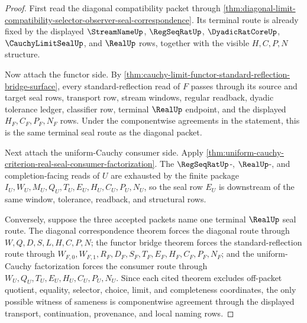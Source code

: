 \begin{proof}
First read the diagonal compatibility packet through \autoref{thm:diagonal-limit-compatibility-selector-observer-seal-correspondence}. Its terminal route is already fixed by the displayed $\StreamNameUp$, $\RegSeqRatUp$, $\DyadicRatCoreUp$, $\CauchyLimitSealUp$, and $\RealUp$ rows, together with the visible $H,C,P,N$ structure.

Now attach the functor side. By \autoref{thm:cauchy-limit-functor-standard-reflection-bridge-surface}, every standard-reflection read of $F$ passes through its source and target seal rows, transport row, stream windows, regular readback, dyadic tolerance ledger, classifier row, terminal $\RealUp$ endpoint, and the displayed $H_F,C_F,P_F,N_F$ rows. Under the componentwise agreements in the statement, this is the same terminal seal route as the diagonal packet.

Next attach the uniform-Cauchy consumer side. Apply \autoref{thm:uniform-cauchy-criterion-real-seal-consumer-factorization}. The $\RegSeqRatUp$-, $\RealUp$-, and completion-facing reads of $U$ are exhausted by the finite package $I_U,W_U,M_U,Q_U,T_U,E_U,H_U,C_U,P_U,N_U$, so the seal row $E_U$ is downstream of the same window, tolerance, readback, and structural rows.

Conversely, suppose the three accepted packets name one terminal $\RealUp$ seal route. The diagonal correspondence theorem forces the diagonal route through $W,Q,D,S,L,H,C,P,N$; the functor bridge theorem forces the standard-reflection route through $W_{F,0},W_{F,1},R_F,D_F,S_F,T_F,E_F,H_F,C_F,P_F,N_F$; and the uniform-Cauchy factorization forces the consumer route through $W_U,Q_U,T_U,E_U,H_U,C_U,P_U,N_U$. Since each cited theorem excludes off-packet quotient, equality, selector, choice, limit, and completeness coordinates, the only possible witness of sameness is componentwise agreement through the displayed transport, continuation, provenance, and local naming rows.
\end{proof}
